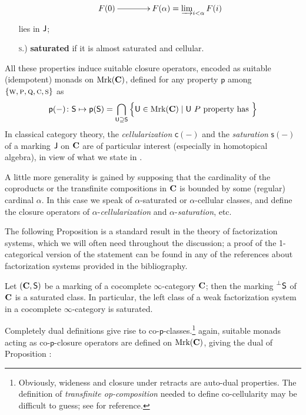 \begin{definition}
\begin{itemize}
\[
\xymatrix@C=1mm{
F(0) \ar[r] & **[r] F(\alpha) = \varinjlim_{i<\alpha}F(i)
}
\]
lies in $\mathsf{J}$;
\item[\textsc{s}.)] \textbf{saturated} if it is almost saturated and cellular.
\end{itemize}
All these properties induce suitable closure operators, encoded as suitable (idempotent) monads on $\text{Mrk}(\mathbf{C})$, defined for any property $\textsf{p}$ among $\{ \textsc{w}, \textsc{p}, \textsc{q}, \textsc{c}, \textsc{s} \}$ as
\[
\textsf{p}(-) \colon
\mathsf{S} \mapsto \textsf{p}(\mathsf{S}) = \bigcap_{\mathsf{U}\supseteq \mathsf{S}}\Big\{ \mathsf{U}\in \text{Mrk}(\mathbf{C})\mid \mathsf{U} \text{ $P$ property has } \Big\}\]
In classical category theory, the \emph{cellularization} $\textsf{c}(-)$ and the \emph{saturation} $\textsf{s}(-)$ of a marking $\mathsf{J}$ on $\mathbf{C}$ are of particular interest (especially in homotopical algebra), in view of what we state in \aprop {}.
\begin{remark}
A little more generality is gained by supposing that the cardinality of the coproducts or the transfinite compositions in $\mathbf{C}$ is bounded by some (regular) cardinal $\alpha$. In this case we speak of $\alpha$\hyp{}saturated or $\alpha$\hyp{}cellular classes, and define the closure operators of $\alpha$\hyp{}\emph{cellularization} and $\alpha$\hyp{}\emph{saturation}, etc.
\end{remark}
\end{definition}
The following Proposition is a standard result in the theory of factorization systems, which we will often need throughout the discussion; a proof of the 1\hyp{}categorical version of the statement can be found in any of the references about factorization systems provided in the bibliography.
\begin{proposition}\label{satu}
Let $(\mathbf{C},\mathsf{S})$ be a marking of a cocomplete $\infty$\hyp{}category $\mathbf{C}$; then the marking $\prescript{\perp}{}{\mathsf{S}}$ of $\mathbf{C}$ is a saturated class. In particular, the left class of a weak factorization system in a cocomplete $\infty$\hyp{}category is saturated.
\end{proposition}
Completely dual definitions give rise to co\hyp{}$\textsf{p}$\hyp{}classes.\footnote{Obviously, wideness and closure under retracts are auto\hyp{}dual properties. The definition of \emph{transfinite op\hyp{}composition} needed to define co\hyp{}cellularity may be difficult to guess; see \cite{Joy} for reference.} again, suitable monads acting as co\hyp{}$\textsf{p}$\hyp{}closure operators are defined on $\text{Mrk}(\mathbf{C})$, giving the dual of Proposition :
